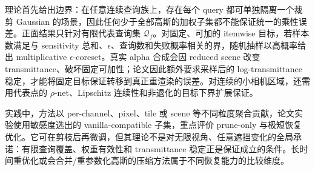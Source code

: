 理论首先给出边界：在任意连续查询族上，存在每个 query 都可单独隔离一个裁剪 Gaussian 的场景，因此任何少于全部高斯的加权子集都不能保证统一的乘性误差。正面结果只针对有限代表查询集 $\mathcal Q_f$。对固定、可加的 itemwise 目标，若样本数满足与 sensitivity 总和、$\epsilon$、查询数和失败概率相关的界，随机抽样以高概率给出 multiplicative $\epsilon$-coreset。真实 alpha 合成会因 reduced scene 改变 transmittance、破坏固定可加性；论文因此额外要求采样后的 log-transmittance 稳定，才能将固定目标保证转移到真正重渲染的误差。对连续的小相机区域，还需用代表点的 $\rho$-net、Lipschitz 连续性和非退化的目标下界扩展保证。

实践中，方法以 per-channel、pixel、tile 或 scene 等不同粒度聚合贡献，论文实验使用敏感度选出的 vanilla-compatible 子集，重点评价 prune-only 与极短恢复优化。它可在剪枝后再微调，但其理论不是对无限视角、任意遮挡变化的全局承诺：有限查询覆盖、权重有效性和 transmittance 稳定正是保证成立的条件。长时间重优化或会合并/重参数化高斯的压缩方法属于不同恢复能力的比较维度。
